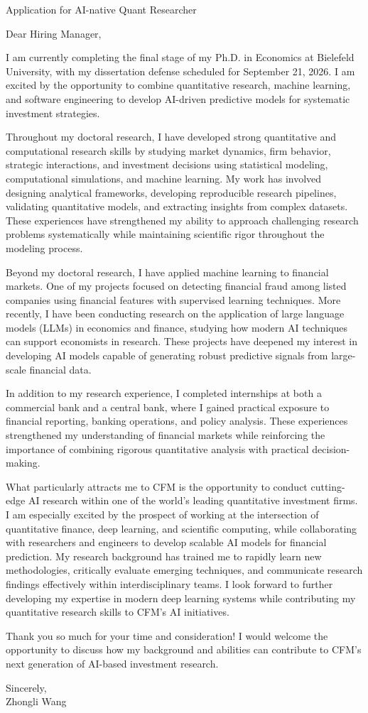 \documentclass[11pt]{article}
\begin{document}
\vspace{0.1cm}

\noindent
Application for AI-native Quant Researcher \\

\vspace{0.05cm}

\noindent Dear Hiring Manager,

I am currently completing the final stage of my Ph.D. in Economics at Bielefeld University, with my dissertation defense scheduled for September 21, 2026. I am excited by the opportunity to combine quantitative research, machine learning, and software engineering to develop AI-driven predictive models for systematic investment strategies.

Throughout my doctoral research, I have developed strong quantitative and computational research skills by studying market dynamics, firm behavior, strategic interactions, and investment decisions using statistical modeling, computational simulations, and machine learning. My work has involved designing analytical frameworks, developing reproducible research pipelines, validating quantitative models, and extracting insights from complex datasets. These experiences have strengthened my ability to approach challenging research problems systematically while maintaining scientific rigor throughout the modeling process.

Beyond my doctoral research, I have applied machine learning to financial markets. One of my projects focused on detecting financial fraud among listed companies using financial features with supervised learning techniques. More recently, I have been conducting research on the application of large language models (LLMs) in economics and finance, studying how modern AI techniques can support economists in research. These projects have deepened my interest in developing AI models capable of generating robust predictive signals from large-scale financial data.

In addition to my research experience, I completed internships at both a commercial bank and a central bank, where I gained practical exposure to financial reporting, banking operations, and policy analysis. These experiences strengthened my understanding of financial markets while reinforcing the importance of combining rigorous quantitative analysis with practical decision-making.

What particularly attracts me to CFM is the opportunity to conduct cutting-edge AI research within one of the world's leading quantitative investment firms. I am especially excited by the prospect of working at the intersection of quantitative finance, deep learning, and scientific computing, while collaborating with researchers and engineers to develop scalable AI models for financial prediction. My research background has trained me to rapidly learn new methodologies, critically evaluate emerging techniques, and communicate research findings effectively within interdisciplinary teams. I look forward to further developing my expertise in modern deep learning systems while contributing my quantitative research skills to CFM's AI initiatives.

Thank you so much for your time and consideration! I would welcome the opportunity to discuss how my background and abilities can contribute to CFM's next generation of AI-based investment research.
\vspace{0.15cm}

\noindent Sincerely, \\[0.2cm]
\noindent Zhongli Wang
\end{document}
